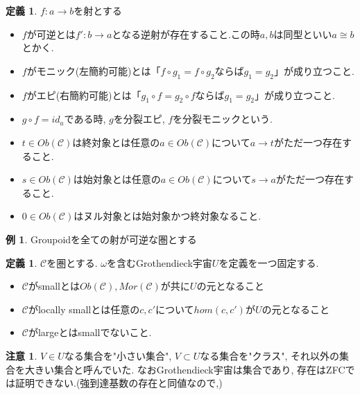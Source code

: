 \documentclass[dvipdfmx,a4paper,11pt]{report}
\theoremstyle{definition}
\newtheorem{dfn}[thm]{定義}
\newtheorem{rem}[thm]{注意}
\newtheorem{exa}[thm]{例}
\begin{document}
 \begin{tcolorbox}
 [colback = white, colframe = green!35!black, fonttitle = \bfseries,breakable = true]
\begin{dfn}
$f : a \to b$を射とする
\begin{itemize}
\item $f$が可逆とは$f' : b \to a$となる逆射が存在すること.この時$a,b$は同型といい$a \cong b$とかく.
\item $f$がモニック(左簡約可能)とは「$f \circ g_1 = f \circ g_2$ならば$g_1 =g_2$」が成り立つこと.
\item $f$がエピ(右簡約可能)とは「$g_1 \circ f  = g_2 \circ f $ならば$g_1 =g_2$」が成り立つこと.
\item $g \circ f = id_{a}$である時, $g$を分裂エピ, $f$を分裂モニックという. 
\item $t \in Ob(\mathcal{C})$は終対象とは任意の$a \in Ob(\mathcal{C})$について$a \to t$がただ一つ存在すること.
\item $s \in Ob(\mathcal{C})$は始対象とは任意の$a \in Ob(\mathcal{C})$について$s\to a$がただ一つ存在すること.
\item $0 \in Ob(\mathcal{C})$はヌル対象とは始対象かつ終対象なること. 
\end{itemize}
\end{dfn}
 \end{tcolorbox}

\begin{exa}
Groupoidを全ての射が可逆な圏とする
\end{exa}


 \begin{tcolorbox}
 [colback = white, colframe = green!35!black, fonttitle = \bfseries,breakable = true]
\begin{dfn}
$\mathcal{C}$を圏とする.
$\omega$を含むGrothendieck宇宙$U$を定義を一つ固定する.  
\begin{itemize}
\item $\mathcal{C}$がsmallとは$Ob(\mathcal{C}), Mor(\mathcal{C})$が共に$U$の元となること
\item $\mathcal{C}$がlocally smallとは任意の$c, c'$について$hom(c,c')$が$U$の元となること
\item $\mathcal{C}$がlargeとはsmallでないこと. 
\end{itemize}
\end{dfn}
\end{tcolorbox}
\begin{rem}
$V \in U$なる集合を"小さい集合", $V \subset U$なる集合を"クラス", それ以外の集合を大きい集合と呼んでいた. 
なおGrothendieck宇宙は集合であり, 存在はZFCでは証明できない.(強到達基数の存在と同値なので,)
\end{rem}
\end{document}
